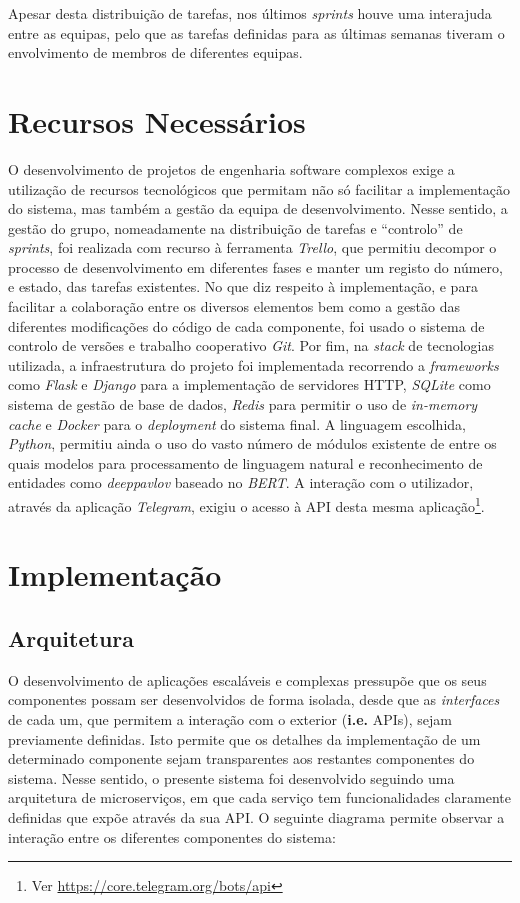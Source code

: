 \documentclass[11pt,a4paper]{article}
\begin{document}
Apesar desta distribuição de tarefas, nos últimos \textit{sprints} houve uma interajuda entre as equipas,
pelo que as tarefas definidas para as últimas semanas tiveram o envolvimento de membros de diferentes
equipas.

\section{Recursos Necessários}
O desenvolvimento de projetos de engenharia software complexos exige a utilização de recursos tecnológicos
que permitam não só facilitar a implementação do sistema, mas também a gestão da equipa de
desenvolvimento. Nesse sentido, a gestão do grupo, nomeadamente na distribuição de tarefas e ``controlo'' de
\textit{sprints}, foi realizada com recurso à ferramenta \textit{Trello}, que permitiu decompor o processo
de desenvolvimento em diferentes fases e manter um registo do número, e estado, das tarefas existentes. No
que diz respeito à implementação, e para facilitar a colaboração entre os diversos elementos bem como a
gestão das diferentes modificações do código de cada componente, foi usado o sistema de controlo de versões
e trabalho cooperativo \textit{Git}. Por fim, na \textit{stack} de tecnologias utilizada, a infraestrutura
do projeto foi implementada recorrendo a \textit{frameworks} como \textit{Flask} e \textit{Django} para a
implementação de servidores HTTP, \textit{SQLite} como sistema de gestão de base de dados, \textit{Redis}
para permitir o uso de \textit{in-memory cache} e \textit{Docker} para o \textit{deployment} do sistema
final. A linguagem escolhida, \textit{Python}, permitiu ainda o uso do vasto número de módulos existente
de entre os quais modelos para processamento de linguagem natural e reconhecimento de entidades como
\textit{deeppavlov} baseado no \textit{BERT}. A interação com o utilizador, através da aplicação
\textit{Telegram}, exigiu o acesso à API desta mesma aplicação\footnote{Ver
\url{https://core.telegram.org/bots/api}}.

\section{Implementação}

\subsection{Arquitetura}
O desenvolvimento de aplicações escaláveis e complexas pressupõe que os seus componentes possam ser
desenvolvidos de forma isolada, desde que as \textit{interfaces} de cada um, que permitem a interação com o
exterior (\textbf{i.e.} APIs), sejam previamente definidas. Isto permite que os detalhes da implementação
de um determinado componente sejam transparentes aos restantes componentes do sistema. Nesse sentido, o
presente sistema foi desenvolvido seguindo uma arquitetura de microserviços, em que cada serviço tem
funcionalidades claramente definidas que expõe através da sua API. O seguinte diagrama permite observar a
interação entre os diferentes componentes do sistema:
\end{document}
